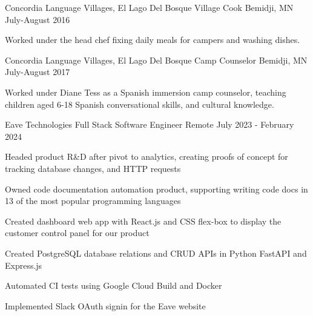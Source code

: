 \documentclass[12pt, a4paper]{awesome-cv}
\begin{document}
\begin{cventries}
\cventry
  {Concordia Language Villages, El Lago Del Bosque}
  {Village Cook}
  {Bemidji, MN}
  {July-August 2016}
  {
    \begin{cvitems}
      \item {Worked under the head chef fixing daily meals for campers and washing dishes.}
    \end{cvitems}
  }

  \cventry
    {Concordia Language Villages, El Lago Del Bosque}
    {Camp Counselor}
    {Bemidji, MN}
    {July-August 2017}
    {
      \begin{cvitems}
        \item {Worked under Diane Tess as a Spanish immersion camp counselor, teaching children aged 6-18 Spanish conversational skills, and cultural knowledge.}
      \end{cvitems}
    }

  \cventry
    {Eave Technologies}
    {Full Stack Software Engineer}
    {Remote}
    {July 2023 - February 2024}
    {
      \begin{cvitems}
        \item{Headed product R\&D after pivot to analytics, creating proofs of concept for tracking database changes, and HTTP requests}
        \item{Owned code documentation automation product, supporting writing code docs in 13 of the most popular programming languages}
        \item{Created dashboard web app with React.js and CSS flex-box to display the customer control panel for our product}
        \item{Created PostgreSQL database relations and CRUD APIs in Python FastAPI and Express.js}
        \item{Automated CI tests using Google Cloud Build and Docker}
        \item{Implemented Slack OAuth signin for the Eave website}
      \end{cvitems}
    }


\end{cventries}
\end{document}

